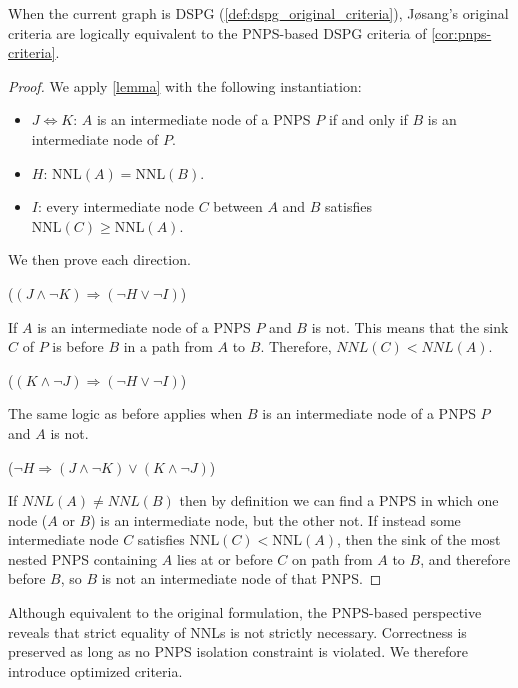\begin{theorem}
\label{thm:criteria-equivalence}
When the current graph is \ac{DSPG} (\cref{def:dspg_original_criteria}), J{\o}sang's original criteria are logically equivalent to the \ac{PNPS}-based \ac{DSPG} criteria of \cref{cor:pnps-criteria}.
\end{theorem}
\begin{proof}
We apply \cref{lemma} with the following instantiation:
\begin{itemize}
    \item $J \Leftrightarrow K$: $A$ is an intermediate node of a \ac{PNPS} $P$ 
    if and only if $B$ is an intermediate node of $P$.
    \item $H$: $\mathrm{NNL}(A) = \mathrm{NNL}(B)$.
    \item $I$: every intermediate node $C$ between $A$ and $B$ satisfies 
    $\mathrm{NNL}(C) \geq \mathrm{NNL}(A)$.
\end{itemize}
We then prove each direction.

($(J \wedge \neg K) \Rightarrow (\neg H \vee \neg I)$)

If $A$ is an intermediate node of a PNPS $P$ and $B$ is not. This means that the sink $C$ of $P$ is before $B$ in a path from $A$ to $B$. Therefore, $NNL(C)<NNL(A)$. 

($(K \wedge \neg J) \Rightarrow (\neg H \vee \neg I)$) 

The same logic as before applies when $B$ is an intermediate node of a PNPS $P$ and $A$ is not.
    
($\neg H \Rightarrow (J \wedge \neg K) \vee (K \wedge \neg J)  $)

If $NNL(A) \neq NNL(B)$ then by definition we can find a PNPS in which one node ($A$ or $B$) is an intermediate node, but the other not. If instead some intermediate node $C$ satisfies $\mathrm{NNL}(C) < \mathrm{NNL}(A)$, then the sink of the most nested \ac{PNPS} containing $A$ lies at or before $C$ on path from $A$ to $B$, and therefore before $B$, so $B$ is not an intermediate node of that \ac{PNPS}.
\end{proof}

Although equivalent to the original formulation, the \ac{PNPS}-based perspective reveals that strict equality of \acp{NNL} is not strictly necessary. Correctness is preserved as long as no  \ac{PNPS} isolation constraint is violated. We therefore introduce optimized criteria.

